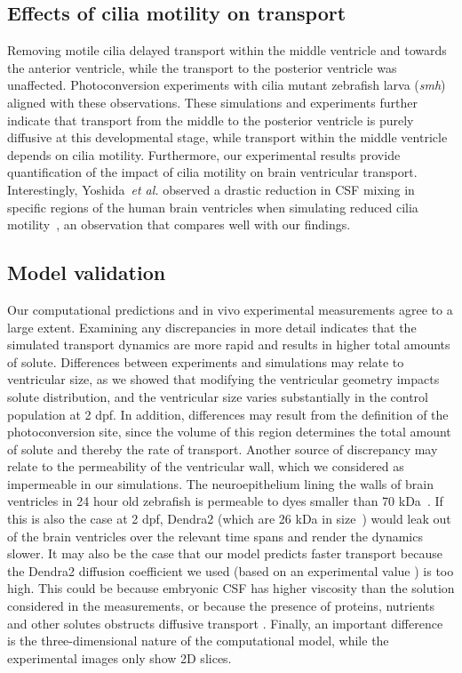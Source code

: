 \documentclass{WileyMSP-template}
\begin{document}
\subsection{Effects of cilia motility on transport}

Removing motile cilia delayed transport within
the middle ventricle and towards the anterior ventricle,
while the transport to the posterior ventricle was unaffected.
Photoconversion experiments with cilia mutant
zebrafish larva (\emph{smh}) aligned with these observations.
These simulations and experiments further indicate that
transport from the middle to the posterior ventricle is
purely diffusive at this developmental stage,
while transport within the middle ventricle
depends on cilia motility.
Furthermore, our experimental results provide quantification
of the impact of cilia motility
on brain ventricular transport.
Interestingly, Yoshida~\emph{et al.} observed a drastic reduction
in CSF mixing in specific regions of the human brain
ventricles when simulating reduced cilia motility~\cite{Yoshida2022EffectVentricles},
an observation that compares well with our findings.  

\subsection{Model validation}

Our computational predictions and in vivo experimental measurements
agree to a large extent. Examining any discrepancies in more detail
indicates that the simulated transport dynamics are more rapid and
results in higher total amounts of solute. Differences between
experiments and simulations may relate to ventricular size, as we
showed that modifying the ventricular geometry impacts solute
distribution, and the ventricular size varies substantially in the
control population at 2 dpf. In addition, differences may result from
the definition of the photoconversion site, since the volume of this
region determines the total amount of solute and thereby the rate of
transport. Another source of discrepancy may relate to the
permeability of the ventricular wall, which we considered as
impermeable in our simulations. The neuroepithelium lining the walls
of brain ventricles in 24 hour old zebrafish is permeable to dyes
smaller than 70 kDa~\cite{Chang2012AnNeuroepithelium}.  If this is
also the case at 2 dpf, Dendra2 (which are 26 kDa in
size~\cite{Gurskaya2006EngineeringLight}) would leak out of the brain
ventricles over the relevant time spans and render the dynamics
slower.  It may also be the case that our model predicts faster
transport because the Dendra2 diffusion coefficient we used (based on
an experimental value \cite{GuraSadovsky2017MeasurementExpansion}) is
too high. This could be because embryonic CSF has higher viscosity
than the solution considered in the measurements, or because the
presence of proteins, nutrients and other solutes obstructs diffusive
transport \cite{Bloomfield1998EffectsFluid, Einstein1905UberTeilchen,
  Cussler2009Diffusion:Systems}. Finally, an important difference is
the three-dimensional nature of the computational model, while the
experimental images only show 2D slices.
\end{document}
